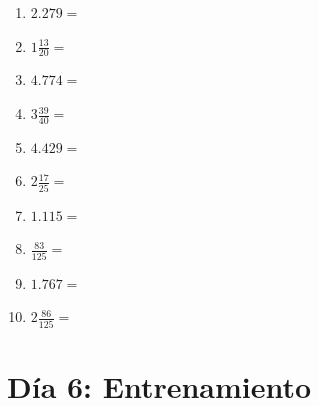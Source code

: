 \documentclass[12pt]{article}
\begin{document}
\begin{enumerate}
\newpage
\item \large $ 2.279 = $ \vspace{1.5cm}
\item \large $ 1 \frac{13}{20} = $ \vspace{1.5cm}
\item \large $ 4.774 = $ \vspace{1.5cm}
\item \large $ 3 \frac{39}{40} = $ \vspace{1.5cm}
\item \large $ 4.429 = $ \vspace{1.5cm}
\item \large $ 2 \frac{17}{25} = $ \vspace{1.5cm}
\item \large $ 1.115 = $ \vspace{1.5cm}
\item \large $ \frac{83}{125} = $ \vspace{1.5cm}
\item \large $ 1.767 = $ \vspace{1.5cm}
\item \large $ 2 \frac{86}{125} = $ \vspace{1.5cm}
\end{enumerate}\newpage
\section*{Día 6: Entrenamiento}
\end{document}
